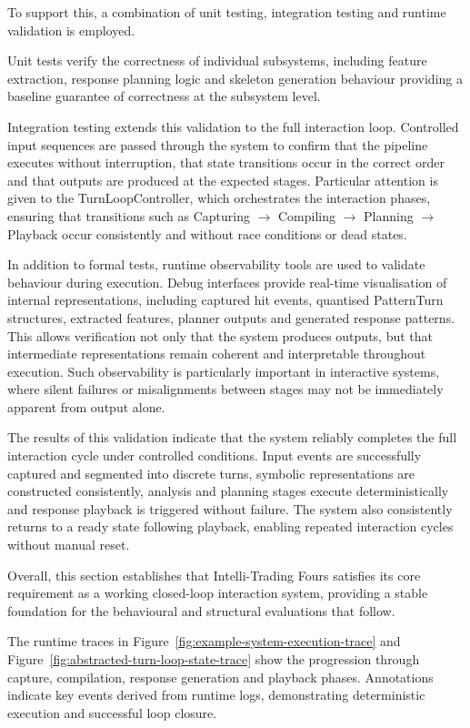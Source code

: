To support this, a combination of unit testing, integration testing and
runtime validation is employed.

Unit tests verify the correctness of individual subsystems, including
feature extraction, response planning logic and skeleton generation
behaviour providing a baseline guarantee of correctness at the subsystem
level.

Integration testing extends this validation to the full interaction
loop. Controlled input sequences are passed through the system to
confirm that the pipeline executes without interruption, that state
transitions occur in the correct order and that outputs are produced at
the expected stages. Particular attention is given to the
TurnLoopController, which orchestrates the interaction phases, ensuring
that transitions such as Capturing \(\rightarrow\) Compiling \(\rightarrow\) Planning \(\rightarrow\) Playback
occur consistently and without race conditions or dead states.

In addition to formal tests, runtime observability tools are used to
validate behaviour during execution. Debug interfaces provide real-time
visualisation of internal representations, including captured hit
events, quantised PatternTurn structures, extracted features, planner
outputs and generated response patterns. This allows verification not
only that the system produces outputs, but that intermediate
representations remain coherent and interpretable throughout execution.
Such observability is particularly important in interactive systems,
where silent failures or misalignments between stages may not be
immediately apparent from output alone.

The results of this validation indicate that the system reliably
completes the full interaction cycle under controlled conditions. Input
events are successfully captured and segmented into discrete turns,
symbolic representations are constructed consistently, analysis and
planning stages execute deterministically and response playback is
triggered without failure. The system also consistently returns to a
ready state following playback, enabling repeated interaction cycles
without manual reset.

Overall, this section establishes that Intelli-Trading Fours satisfies
its core requirement as a working closed-loop interaction system,
providing a stable foundation for the behavioural and structural
evaluations that follow.

The runtime traces in Figure~\ref{fig:example-system-execution-trace} and Figure~\ref{fig:abstracted-turn-loop-state-trace} show the progression through capture, compilation, response generation and playback phases. Annotations indicate key events derived from runtime logs, demonstrating deterministic execution and successful loop closure.

